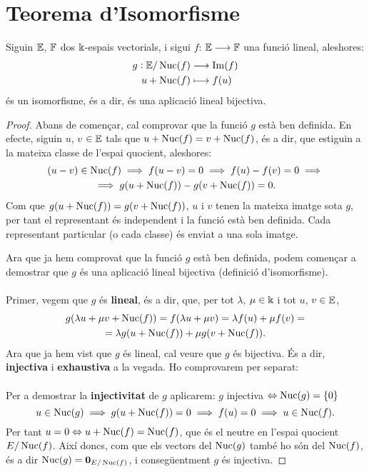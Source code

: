 \section{Teorema d'Isomorfisme}

Siguin $\mathbb{E}$, $\mathbb{F}$ dos $\Bbbk$-espais vectorials, i sigui $f$: $\mathbb{E} \longrightarrow \mathbb{F}$ una funció lineal, aleshores:
\[
\begin{aligned}
g: \mathbb{E}/\operatorname{Nuc}(f) & \longrightarrow \operatorname{Im}(f)\\
u + \operatorname{Nuc}(f) & \longmapsto f(u)\\
\end{aligned}
\]
és un isomorfisme, és a dir, és una aplicació lineal bijectiva.
\\

\begin{proof}

Abans de començar, cal comprovar que la funció $g$ està ben definida. En efecte, siguin $u$, $v$ $\in \mathbb{E}$ tals que $u + \operatorname{Nuc}(f) = v + \operatorname{Nuc}(f)$, és a dir, que estiguin a la mateixa classe de l'espai quocient, aleshores:
\begin{gather*}
    (u-v) \in \operatorname{Nuc}(f) \implies f(u-v) = 0 \implies f(u) - f(v) = 0 \implies \\
    \implies g(u + \operatorname{Nuc}(f)) - g(v + \operatorname{Nuc}(f)) = 0.
\end{gather*}
Com que $g(u + \operatorname{Nuc}(f)) = g(v + \operatorname{Nuc}(f))$, $u$ i $v$ tenen la mateixa imatge sota $g$, per tant el representant és independent i la funció està ben definida. Cada representant particular (o cada classe) és enviat a una sola imatge.


Ara que ja hem comprovat que la funció $g$ està ben definida, podem començar a demostrar que $g$ és una aplicació lineal bijectiva (definició d'isomorfisme). \\\\Primer, vegem que  $g$ és \textbf{lineal}, és a dir, que, per tot $\lambda$, $\mu \in \Bbbk$ i tot $u$, $v \in \mathbb{E}$, 
\begin{gather*}
g(\lambda u + \mu v + \operatorname{Nuc}(f))  = f(\lambda u + \mu v) = \lambda f(u) + \mu f(v) =\\
= \lambda g(u + \operatorname{Nuc}(f)) + \mu g(v + \operatorname{Nuc}(f)).
\end{gather*}
Ara que ja hem vist que $g$ és lineal, cal veure que $g$ és bijectiva. És a dir, \textbf{injectiva} i \textbf{exhaustiva} a la vegada. Ho comprovarem per separat:
\\\\
Per a demostrar la \textbf{injectivitat} de $g$ aplicarem: $g$ injectiva $\Leftrightarrow \operatorname{Nuc}(g) = \{0\}$
\[
u \in \operatorname{Nuc}(g) \implies g(u + \operatorname{Nuc}(f)) = 0 \implies f(u) = 0 \implies u \in \operatorname{Nuc}(f).
\]
Per tant $u = 0 \Leftrightarrow u + \operatorname{Nuc}(f) = \operatorname{Nuc}(f)$, que és el neutre en l'espai quocient $E/\operatorname{Nuc}(f)$. Així doncs, com que els vectors del $\operatorname{Nuc}(g)$ també ho són del $\operatorname{Nuc}(f)$, és a dir $\operatorname{Nuc}(g) = {\textbf{0}_{E/\operatorname{Nuc}(f)}}$, i consegüentment $g$ és injectiva.


\end{proof}
